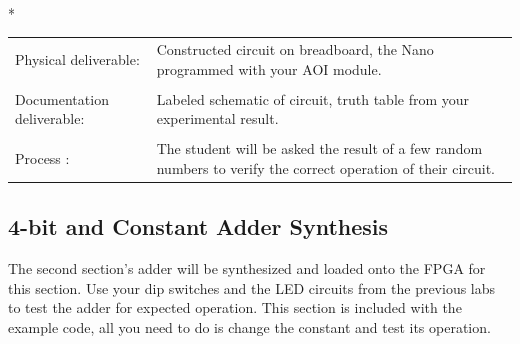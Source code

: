       \vspace{15px}
      \begin{centering}
        \begin{fminipage}{.43\textwidth}
          \vspace{3px}
          \\*
          \vspace{10px}
          \begin{tabular}{p{1.8cm}  p{5.4cm}}
            \raggedright Physical deliverable:                         &Constructed circuit on breadboard,  the Nano programmed with your AOI module.\\
            \\
            \raggedright Documentation deliverable:          & Labeled schematic of circuit,  truth table from your  experimental result.\\
            \\
            Process :                                                                            &The student will be asked the result of a few random numbers to verify the correct operation of their circuit.
          \end{tabular}
        \end{fminipage}
      \end{centering}
  \subsection{4-bit and Constant Adder Synthesis}
    The second section's adder will be synthesized and loaded onto the FPGA for this section. Use your dip switches and the LED circuits from the previous labs to test the adder for expected operation. This section is included with the example code, all you need to do is change the constant and test its operation.  

